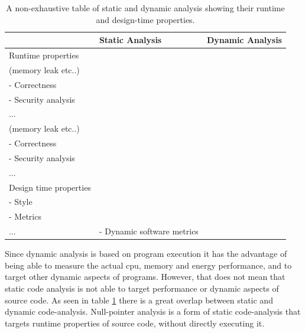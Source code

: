 \documentclass[pdftex,10pt,b5paper,twoside]{report}
\begin{document}
\begin{table}[h!]
\centering
\begin{tabularx}{\textwidth}{|X|X|X|}
\hline
                                & Static Analysis                                                                                        & Dynamic Analysis                                                                                       \\ \hline
Runtime properties     & \begin{tabular}[c]{@{}l@{}}- Performance \\(memory leak etc..)\\ - Correctness\\ - Security analysis\\ ...\end{tabular} & \begin{tabular}[c]{@{}l@{}}- Performance \\(memory leak etc..)\\ - Correctness\\ - Security analysis\\ ...\end{tabular} \\ \hline
Design time properties & \begin{tabular}[c]{@{}l@{}}- Design principles \\ - Style\\ - Metrics\\ ...\end{tabular}                              & - Dynamic software metrics                                                                                            \\ \hline
\end{tabularx}
\caption{A non-exhaustive table of static and dynamic analysis showing their runtime and design-time properties.}
\label{table:static-dynamic}
\end{table}

Since dynamic analysis is based on program execution it has the advantage of being able to measure the actual \gls{cpu}, memory and energy performance, and to target other dynamic aspects of programs. However, that does not mean that static code analysis is not able to target performance or dynamic aspects of source code. As seen in table \ref{table:static-dynamic} there is a great overlap between static and dynamic code-analysis. Null-pointer analysis is a form of static code-analysis that targets runtime properties of source code, without directly executing it.
\end{document}

